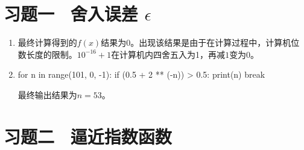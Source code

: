 \section{习题一 \ 舍入误差 $\epsilon$ }
\begin{enumerate}
    \item 最终计算得到的$f(x)$结果为0。出现该结果是由于在计算过程中，计算机位数长度的限制。$10^{-16}+1$在计算机内四舍五入为1，再减$1$变为0。
    \item \begin{python}
              for n in range(101, 0, -1):
              if (0.5 + 2 ** (-n)) > 0.5:
              print(n)
              break
          \end{python}
          最终输出结果为$n=53$。
\end{enumerate}

\section{习题二 \ 逼近指数函数}
